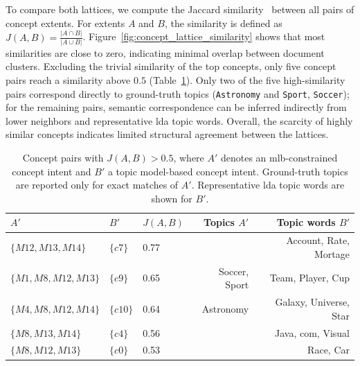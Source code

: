 To compare both lattices, we compute the Jaccard similarity~\cite{Glckstad2013UnsupervisedKS} between all pairs of concept extents.
For extents $A$ and $B$, the similarity is defined as $J(A,B) = \frac{|A \cap B|}{|A \cup B|}$.
Figure~\ref{fig:concept_lattice_similarity} shows that most similarities are close to zero, indicating minimal overlap between document clusters.
Excluding the trivial similarity of the top concepts, only five concept pairs reach a similarity above $0.5$ (Table~\ref{tab:concept_jaccard_similarity}). 
Only two of the five high-similarity pairs correspond directly to ground-truth topics (\texttt{Astronomy} and \texttt{Sport}, \texttt{Soccer}); for the remaining pairs, semantic correspondence can be inferred indirectly from lower neighbors and representative \ac{lda} topic words. 
Overall, the scarcity of highly similar concepts indicates limited structural agreement between the lattices.

\begin{table}[t]
\centering
\caption{Concept pairs with $J(A,B)>0.5$, where $A'$ denotes an \ac{mlb}-constrained concept intent and $B'$ a topic model-based concept intent. Ground-truth topics are reported only for exact matches of $A'$. Representative \ac{lda} topic words are shown for $B'$.}
\label{tab:concept_jaccard_similarity}
\begin{tabular}{lllrr}
\toprule
$A'$ & $B'$ & $J(A,B)$ & Topics $A'$ & Topic words $B'$ \\
\midrule
$\{M12, M13, M14\}$ & $\{c7\}$ & 0.77 &  &  Account, Rate, Mortage\\ %
$\{M1, M8, M12, M13\}$  & $\{c9\}$ & 0.65 & Soccer, Sport &  Team, Player, Cup \\
$\{M4, M8, M12, M14\}$  & $\{c10\}$ & 0.64 & Astronomy &  Galaxy, Universe, Star \\
$\{M8, M13, M14\}$ & $\{c4\}$ & 0.56 & & Java, com, Visual \\ %
$\{M8, M12, M13\}$ & $\{c0\}$ & 0.53 &  &  Race, Car\\ %
\bottomrule
\end{tabular}
\end{table}



